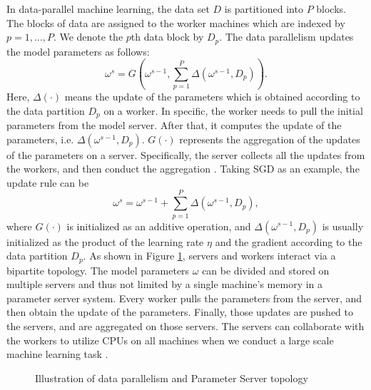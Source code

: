 \documentclass[preprint,review,11pt,a4paper]{elsarticle}
\begin{document}
In data-parallel machine learning, the data set $D$ is partitioned into $P$ blocks. The blocks of data are assigned to the worker machines which are indexed by $p=1, \ldots, P$. We denote the $p$th data block by $D_p$. The data parallelism updates the model parameters as follows:
\begin{equation}
\omega^s=G\left(\omega^{s-1}, \sum_{p=1}^P\Delta(\omega^{s-1}, D_p)\right).
\end{equation} Here, $\Delta(\cdot)$ means the update of the parameters which is obtained according to the data partition $D_p$ on a worker. In specific, the worker needs to pull the initial parameters from the model server. After that, it computes the update of the parameters, i.e. $\Delta(\omega^{s-1}, D_p)$. $G(\cdot)$ represents the aggregation of the updates of the parameters on a server. Specifically, the server collects all the updates from the workers, and then conduct the aggregation \cite{ho2013more} \cite{xing2015petuum}. Taking SGD as an example, the update rule can be
\begin{equation}
\omega^s=\omega^{s-1} + \sum_{p=1}^P \Delta(\omega^{s-1}, D_p),
\end{equation}
where $G(\cdot)$ is initialized as an additive operation, and $\Delta(\omega^{s-1}, D_p)$ is usually initialized  as the product of the learning rate $\eta$ and the gradient according to the data partition $D_p$. As shown in Figure \ref{figure_data_parallelism},  servers and workers interact via a bipartite topology. The model parameters $\omega$ can be divided and stored on multiple servers and thus not limited by a single machine's memory in a parameter server system. Every worker pulls the parameters from the server, and then  obtain the update of the parameters. Finally, those updates are pushed to the servers, and are aggregated on those servers. The servers can collaborate with the workers to utilize CPUs on all machines when we conduct a large scale machine learning task \cite{dai2015high} \cite{ho2013more}.

\begin{figure}
\centering

\caption{Illustration of data parallelism and Parameter Server topology} \label{figure_data_parallelism}
\end{figure}
\end{document}
